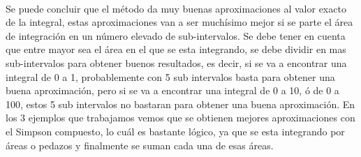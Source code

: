 \documentclass[report,oneside]{revcoles}
\begin{document}
~\\Se puede concluir que el método da muy buenas aproximaciones al valor exacto de la integral, estas aproximaciones van a ser muchísimo mejor si se parte el área de integración en un número elevado de sub-intervalos. Se debe tener en cuenta que entre mayor sea el área en el que se esta integrando, se debe dividir en mas sub-intervalos para obtener buenos resultados, es decir, si se va a encontrar una integral de 0 a 1, probablemente con 5 sub intervalos basta para obtener una buena aproximación, pero si se va a encontrar una integral de 0 a 10, ó de 0 a 100, estos 5 sub intervalos no bastaran para obtener una buena aproximación. En los 3 ejemplos que trabajamos vemos que se obtienen mejores aproximaciones con el Simpson compuesto, lo cuál es bastante lógico, ya que se esta integrando por áreas o pedazos y finalmente se suman cada una de esas áreas.


    \appendix%


\end{document}
